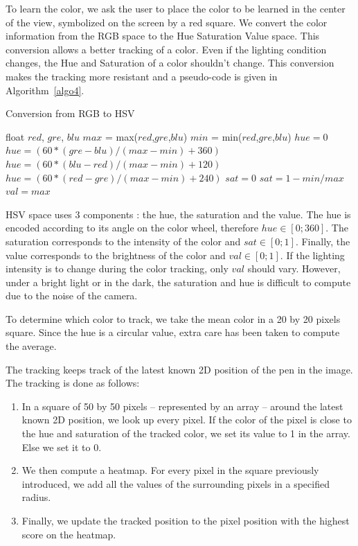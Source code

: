 \documentclass[12pt]{article}
\begin{document}
To learn the color, we ask the user to place the color to be learned in the center of the view, symbolized on the screen by a red square. We convert the color information from the RGB space to the Hue Saturation Value space. This conversion allows a better tracking of a color. Even if the lighting condition changes, the Hue and Saturation of a color shouldn't change. This conversion makes the tracking more resistant and a pseudo-code is given in Algorithm~\ref{algo4}.

\begin{algorithm}
\caption{Conversion from RGB to HSV}\label{algo4}
\begin{algorithmic}[1]
\State float $red$, $gre$, $blu$
\State $max$ = max($red$,$gre$,$blu$)
\State $min$ = min($red$,$gre$,$blu$)
  \State $hue = 0$
  \State $hue = (60*(gre-blu)/(max-min) + 360)$
  \EndIf
{}
  \State $hue = (60*(blu-red)/(max-min) + 120)$
\Else
  \State $hue = (60*(red-gre)/(max-min) + 240)$
\EndIf
{}
  \State $sat = 0$
\Else
  \State $sat = 1-min/max$
\EndIf
\State $val = max$
\end{algorithmic}
\end{algorithm}

HSV space uses 3 components : the hue, the saturation and the value. The hue is encoded according to its angle on the color wheel, therefore $hue \in [0;360]$. The saturation corresponds to the intensity of the color and $sat \in [0;1]$. Finally, the value corresponds to the brightness of the color and $val \in [0;1]$. If the lighting intensity is to change during the color tracking, only $val$ should vary. However, under a bright light or in the dark, the saturation and hue is difficult to compute due to the noise of the camera.

To determine which color to track, we take the mean color in a 20 by 20 pixels square. Since the hue is a circular value, extra care has been taken to compute the average.

The tracking keeps track of the latest known 2D position of the pen in the image. The tracking is done as follows:
\begin{enumerate}
\item In a square of 50 by 50 pixels -- represented by an array -- around the latest known 2D position, we look up every pixel. If the color of the pixel is close to the hue and saturation of the tracked color, we set its value to 1 in the array. Else we set it to 0.
\item We then compute a heatmap. For every pixel in the square previously introduced, we add all the values of the surrounding pixels in a specified radius.
\item Finally, we update the tracked position to the pixel position with the highest score on the heatmap.
\end{enumerate}
\end{document}
